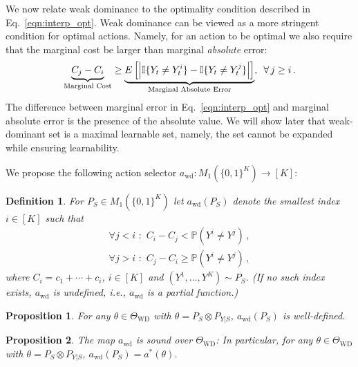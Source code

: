 \documentclass[11pt]{article} %
\newcommand{\WD}{\mathrm{WD}}
\newcommand{\TWD}{\Theta_{\WD}}
\newcommand{\awd}{a_{\mathrm{wd}}}
\newcommand{\Prob}[1]{\mathbb{P}\left(#1\right)}
\newtheorem{prop}{Proposition}
\newtheorem{defi}{Definition}
\begin{document}
We now relate weak dominance to the optimality condition described in Eq.~\eqref{eqn:interp_opt}. Weak dominance can be viewed as a more stringent condition for optimal actions. Namely, for an action to be optimal we also require that the marginal cost be larger than marginal \emph{absolute} error:
\begin{equation} \label{eqn:interp_WD}
\underbrace{C_j - C_i}_{\text{Marginal Cost}} \geq \underbrace{ E \left [ \left | \mathbb{I}\{Y_t \ne Y_t^i\} - \mathbb{I}\{Y_t \ne Y_t^j\} \right | \right ]}_{\text{Marginal Absolute Error}},\,\,\, \forall \, j \geq i\,.
\end{equation}
The difference between marginal error in Eq.~\eqref{eqn:interp_opt} and marginal absolute error is the presence of the absolute value. We will show later that weak-dominant set is a maximal learnable set, namely, the set cannot be expanded while ensuring learnability.


We propose the following action selector $\awd: M_1(\{0,1\}^K)  \to [K]$:
\begin{defi}\label{def:awd}
For $P_S \in M_1(\{0,1\}^K) $ let $\awd(P_S)$ denote the smallest index $i\in [K]$ such that
\begin{subequations}
\begin{align}
\forall j<i \,\,:\,\, C_i - C_j < \Prob{ Y^i \ne Y^j }\,, \label{eq:wd1}\\ 
\forall j>i \,\,:\,\, C_j - C_i \ge \Prob{ Y^i \ne Y^j }\,, \label{eq:wd2}
\end{align}
\end{subequations}
where $C_i = c_1+\cdots + c_i$, $i\in [K]$ and $(Y^1,\dots,Y^K) \sim P_S$.
(If no such index exists, $\awd$ is undefined, i.e., $\awd$ is a partial function.)
\end{defi}
\begin{prop}
\label{prop:awdwelldef}
For any $\theta \in \TWD$ with $\theta = P_S\otimes P_{Y|S}$, $\awd(P_S)$ is well-defined.
\end{prop}

\begin{prop}
\label{prop:awdsound}
The map $\awd$ is sound over $\TWD$: In particular, for any
$\theta\in \TWD$ with $\theta = P_S\otimes P_{Y|S}$, $\awd(P_S)= a^*(\theta)$.
\end{prop}
\end{document}
